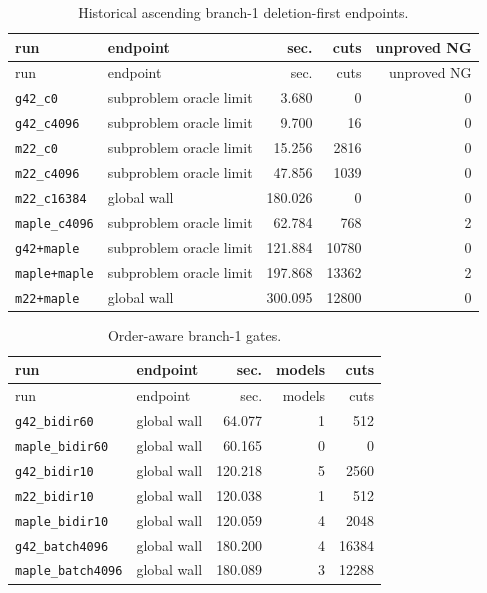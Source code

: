 \begin{longtable}{@{}>{\raggedright\arraybackslash\scriptsize}p{}
                  >{\raggedright\arraybackslash}p{}
                  rrr@{}}
\caption{Historical ascending branch-1 deletion-first endpoints.}
\label{tab:benders-seven}\\
\toprule
run & endpoint & sec. & cuts & unproved NG\\
\midrule
\endfirsthead
\toprule
run & endpoint & sec. & cuts & unproved NG\\
\midrule
\endhead
\texttt{g42\_c0} & subproblem oracle limit & 3.680 & 0 & 0\\
\texttt{g42\_c4096} & subproblem oracle limit & 9.700 & 16 & 0\\
\texttt{m22\_c0} & subproblem oracle limit & 15.256 & 2816 & 0\\
\texttt{m22\_c4096} & subproblem oracle limit & 47.856 & 1039 & 0\\
\texttt{m22\_c16384} & global wall & 180.026 & 0 & 0\\
\texttt{maple\_c4096} & subproblem oracle limit & 62.784 & 768 & 2\\
\texttt{g42+maple} & subproblem oracle limit & 121.884 & 10780 & 0\\
\texttt{maple+maple} & subproblem oracle limit & 197.868 & 13362 & 2\\
\texttt{m22+maple} & global wall & 300.095 & 12800 & 0\\
\bottomrule
\end{longtable}

\begin{longtable}{@{}>{\raggedright\arraybackslash\scriptsize}p{}
                  >{\raggedright\arraybackslash}p{}
                  rrr@{}}
\caption{Order-aware branch-1 gates.}\label{tab:benders-seven-ordered}\\
\toprule
run & endpoint & sec. & models & cuts\\
\midrule
\endfirsthead
\toprule
run & endpoint & sec. & models & cuts\\
\midrule
\endhead
\texttt{g42\_bidir60} & global wall & 64.077 & 1 & 512\\
\texttt{maple\_bidir60} & global wall & 60.165 & 0 & 0\\
\texttt{g42\_bidir10} & global wall & 120.218 & 5 & 2560\\
\texttt{m22\_bidir10} & global wall & 120.038 & 1 & 512\\
\texttt{maple\_bidir10} & global wall & 120.059 & 4 & 2048\\
\texttt{g42\_batch4096} & global wall & 180.200 & 4 & 16384\\
\texttt{maple\_batch4096} & global wall & 180.089 & 3 & 12288\\
\bottomrule
\end{longtable}


